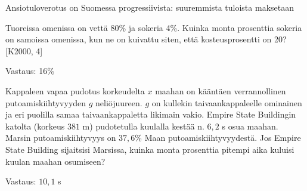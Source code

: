 Ansiotuloverotus on Suomessa progressiivista: suuremmista tuloista maksetaan

\begin{tehtava}
    Tuoreissa omenissa on vettä 80\% ja sokeria 4\%. Kuinka monta prosenttia sokeria on samoissa omenissa, kun ne on kuivattu siten, 
    että kosteusprosentti on 20? [K2000, 4]
    
    \begin{vastaus}
        Vastaus: 16\%
    \end{vastaus}
\end{tehtava}

\begin{tehtava}
    Kappaleen vapaa pudotus korkeudelta $x$ maahan on kääntäen verrannollinen putoamiskiihtyvyyden $g$ neliöjuureen. $g$ on kullekin     
    taivaankappaleelle ominainen ja eri puolilla samaa taivaankappaletta likimain vakio. Empire State Buildingin katolta (korkeus 
    $381$ m) pudotetulla kuulalla kestää n. $6,2$ s osua maahan. Marsin putoamiskiihtyvyys on $37,6$\%  Maan putoamiskiihtyvyydestä. 
    Jos Empire State Building sijaitsisi Marsissa, kuinka monta prosenttia pitempi aika kuluisi kuulan maahan osumiseen?

    \begin{vastaus}
        Vastaus: $10,1$ s
    \end{vastaus}
\end{tehtava}
